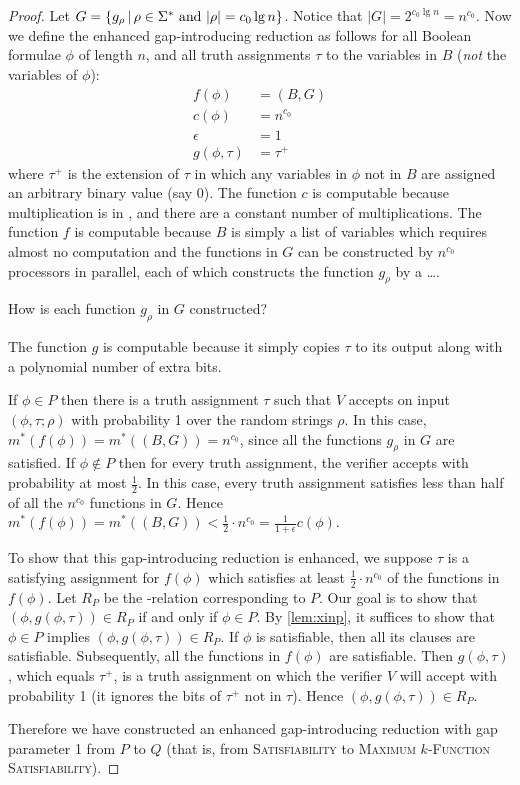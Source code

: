 \documentclass[]{article}
\begin{document}
\begin{proof}
  Let $G = \left\{g_\rho \,\middle|\, \rho \in \Sigma^* \textnormal{ and } |\rho| = c_0 \lg n \right\}$.
  Notice that $|G| = 2^{c_0 \lg n} = n^{c_0}$.
  Now we define the enhanced gap-introducing reduction as follows for all Boolean formulae $\phi$ of length $n$, and all truth assignments $\tau$ to the variables in $B$ (\emph{not} the variables of $\phi$):
  \begin{align*}
    f(\phi) & = (B, G) \\
    c(\phi) & = n^{c_0} \\
    \epsilon & = 1 \\
    g(\phi, \tau) & = \tau^+
  \end{align*}
  where $\tau^+$ is the extension of $\tau$ in which any variables in $\phi$ not in $B$ are assigned an arbitrary binary value (say 0).
  The function $c$ is \NC{} computable because multiplication is in \NC{}, and there are a constant number of multiplications.
  The function $f$ is \NC{} computable because $B$ is simply a list of variables which requires almost no computation and the functions in $G$ can be constructed by $n^{c_0}$ processors in parallel, each of which constructs the function $g_\rho$ by a \ldots.
  \begin{todo}
    How is each function $g_\rho$ in $G$ constructed?
  \end{todo}
  The function $g$ is \NC{} computable because it simply copies $\tau$ to its output along with a polynomial number of extra bits.

  If $\phi \in P$ then there is a truth assignment $\tau$ such that $V$ accepts on input $(\phi, \tau; \rho)$ with probability 1 over the random strings $\rho$.
  In this case, $m^*(f(\phi)) = m^*((B, G)) = n^{c_0}$, since all the functions $g_\rho$ in $G$ are satisfied.
  If $\phi \notin P$ then for every truth assignment, the verifier accepts with probability at most $\frac{1}{2}$.
  In this case, every truth assignment satisfies less than half of all the $n^{c_0}$ functions in $G$.
  Hence $m^*(f(\phi)) = m^*((B, G)) < \frac{1}{2} \cdot n^{c_0} = \frac{1}{1 + \epsilon} c(\phi)$.
  
  To show that this gap-introducing reduction is enhanced, we suppose $\tau$ is a satisfying assignment for $f(\phi)$ which satisfies at least $\frac{1}{2} \cdot n^{c_0}$ of the functions in $f(\phi)$.
  Let $R_P$ be the \NP-relation corresponding to $P$.
  Our goal is to show that $(\phi, g(\phi, \tau)) \in R_P$ if and only if $\phi \in P$.
  By \autoref{lem:xinp}, it suffices to show that $\phi \in P$ implies $(\phi, g(\phi, \tau)) \in R_P$.
  If $\phi$ is satisfiable, then all its clauses are satisfiable.
  Subsequently, all the functions in $f(\phi)$ are satisfiable.
  Then $g(\phi, \tau)$, which equals $\tau^+$, is a truth assignment on which the verifier $V$ will accept with probability 1 (it ignores the bits of $\tau^+$ not in $\tau$).
  Hence $(\phi, g(\phi, \tau)) \in R_P$.

  Therefore we have constructed an \NC{} enhanced gap-introducing reduction with gap parameter 1 from $P$ to $Q$ (that is, from \textsc{Satisfiability} to \textsc{Maximum $k$-Function Satisfiability}).
\end{proof}
\end{document}

